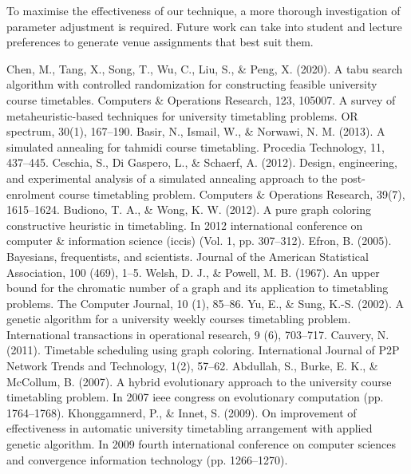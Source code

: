\documentclass[conference]{IEEEtran}
\begin{document}
To maximise the effectiveness of our technique, a more thorough investigation of parameter adjustment is required. Future work can take into student and lecture preferences to generate venue assignments that best suit them.

\begin{thebibliography}{00}
 Chen, M., Tang, X., Song, T., Wu, C., Liu, S., \& Peng, X. (2020). A tabu search algorithm with controlled randomization for constructing feasible university course timetables. Computers \& Operations Research, 123, 105007.
 A survey of metaheuristic-based techniques for university timetabling problems. OR spectrum, 30(1), 167–190.
 Basir, N., Ismail, W., \& Norwawi, N. M. (2013). A simulated annealing for tahmidi course timetabling. Procedia Technology, 11, 437–445.
 Ceschia, S., Di Gaspero, L., \& Schaerf, A. (2012). Design, engineering, and experimental analysis of a simulated annealing approach to the post-enrolment course timetabling problem. Computers \& Operations Research, 39(7), 1615–1624.
 Budiono, T. A., \& Wong, K. W. (2012). A pure graph coloring constructive heuristic in timetabling. In 2012 international conference on computer \& information science (iccis) (Vol. 1, pp. 307–312).
 Efron, B. (2005). Bayesians, frequentists, and scientists. Journal of the American Statistical Association, 100 (469), 1–5.
 Welsh, D. J., \& Powell, M. B. (1967). An upper bound for the chromatic number of a graph and its application to timetabling problems. The Computer Journal, 10 (1), 85–86.
 Yu, E., \& Sung, K.-S. (2002). A genetic algorithm for a university weekly courses timetabling problem. International transactions in operational research, 9 (6), 703–717.
 Cauvery, N. (2011). Timetable scheduling using graph coloring. International Journal of P2P Network Trends and Technology, 1(2), 57–62.
 Abdullah, S., Burke, E. K., \& McCollum, B. (2007). A hybrid evolutionary approach to the university course timetabling problem. In 2007 ieee congress on evolutionary computation (pp. 1764–1768).
 Khonggamnerd, P., \& Innet, S. (2009). On improvement of effectiveness in automatic university timetabling arrangement with applied genetic algorithm. In 2009 fourth international conference
on computer sciences and convergence information technology (pp. 1266–1270).

\end{thebibliography}
\end{document}
